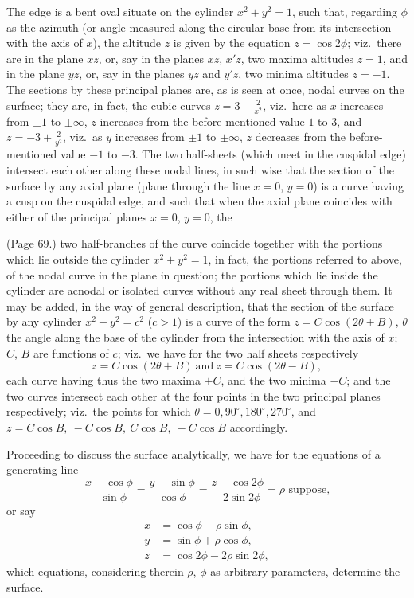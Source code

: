 \documentclass[11pt,a4paper]{article}
\begin{document}
The edge is a bent oval situate on the cylinder $x^2 + y^2 = 1$, such that, regarding $\phi$ as the azimuth (or angle measured along the circular base from its intersection with the axis of $x$), the altitude $z$ is given by the equation $z = \cos 2\phi$; viz.\ there are in the plane $xz$, or, say in the planes $xz$, $x'z$, two maxima altitudes $z = 1$, and in the plane $yz$, or, say in the planes $yz$ and $y'z$, two minima altitudes $z = -1$. The sections by these principal planes are, as is seen at once, nodal curves on the surface; they are, in fact, the cubic curves $z = 3 - \frac{2}{x^2}$, viz.\ here as $x$ increases from $\pm 1$ to $\pm\infty$, $z$ increases from the before-mentioned value $1$ to $3$, and $z = -3 + \frac{2}{y^2}$, viz.\ as $y$ increases from $\pm 1$ to $\pm\infty$, $z$ decreases from the before-mentioned value $-1$ to $-3$. The two half-sheets (which meet in the cuspidal edge) intersect each other along these nodal lines, in such wise that the section of the surface by any axial plane (plane through the line $x = 0$, $y = 0$) is a curve having a cusp on the cuspidal edge, and such that when the axial plane coincides with either of the principal planes $x = 0$, $y = 0$, the

\bigskip

\noindent (Page 69.) two half-branches of the curve coincide together with the portions which lie outside the cylinder $x^2 + y^2 = 1$, in fact, the portions referred to above, of the nodal curve in the plane in question; the portions which lie inside the cylinder are acnodal or isolated curves without any real sheet through them. It may be added, in the way of general description, that the section of the surface by any cylinder $x^2 + y^2 = c^2$ ($c > 1$) is a curve of the form $z = C \cos(2\theta \pm B)$, $\theta$ the angle along the base of the cylinder from the intersection with the axis of $x$; $C$, $B$ are functions of $c$; viz.\ we have for the two half sheets respectively
\[
z = C \cos(2\theta + B)\ \text{and}\ z = C \cos(2\theta - B),
\]
each curve having thus the two maxima $+ C$, and the two minima $-C$; and the two curves intersect each other at the four points in the two principal planes respectively; viz.\ the points for which $\theta = 0, 90^\circ, 180^\circ, 270^\circ$, and $z = C \cos B,\ -C \cos B,\ C \cos B,\ -C \cos B$ accordingly.

Proceeding to discuss the surface analytically, we have for the equations of a generating line
\[
\frac{x - \cos\phi}{-\sin\phi} = \frac{y - \sin\phi}{\cos\phi} = \frac{z - \cos 2\phi}{-2\sin 2\phi} = \rho \text{ suppose,}
\]
or say
\begin{align*}
x &= \cos\phi - \rho\sin\phi, \\
y &= \sin\phi + \rho\cos\phi, \\
z &= \cos 2\phi - 2\rho\sin 2\phi,
\end{align*}
which equations, considering therein $\rho$, $\phi$ as arbitrary parameters, determine the surface.
\end{document}
